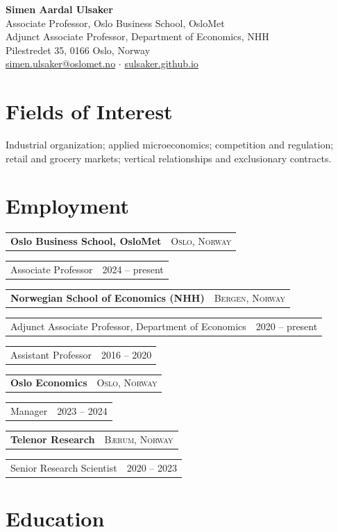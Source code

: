 \documentclass[10pt,a4paper]{article}
\makeatletter
\newcommand{\org}[2]{%
  \vspace{0.42em}%
  \begin{tabularx}{\linewidth}{@{}Xr@{}}
    \textbf{#1} & \textsc{\small #2}
  \end{tabularx}\par\vspace{0.15em}}
\newcommand{\role}[2]{%
  \hspace*{1.1em}%
  \begin{tabularx}{\dimexpr\linewidth-1.1em}{@{}Xr@{}}
    #1 & {\small #2}
  \end{tabularx}\par\vspace{0.1em}}
\makeatother
\begin{document}
\begin{center}
  {\LARGE\bfseries Simen Aardal Ulsaker}\\[0.55em]
  {\small
   Associate Professor, Oslo Business School, OsloMet\\
   Adjunct Associate Professor, Department of Economics, NHH\\[0.35em]
   Pilestredet 35, 0166 Oslo, Norway\\[0.2em]
   \href{mailto:simen.ulsaker@oslomet.no}{simen.ulsaker@oslomet.no} \;$\cdot$\;
   \href{https://sulsaker.github.io}{sulsaker.github.io}}
\end{center}

\vspace{0.6em}

\section{Fields of Interest}

Industrial organization; applied microeconomics; competition and regulation;
retail and grocery markets; vertical relationships and exclusionary contracts.

\section{Employment}

\org{Oslo Business School, OsloMet}{Oslo, Norway}
\role{Associate Professor}{2024 -- present}

\org{Norwegian School of Economics (NHH)}{Bergen, Norway}
\role{Adjunct Associate Professor, Department of Economics}{2020 -- present}
\role{Assistant Professor}{2016 -- 2020}

\org{Oslo Economics}{Oslo, Norway}
\role{Manager}{2023 -- 2024}

\org{Telenor Research}{Bærum, Norway}
\role{Senior Research Scientist}{2020 -- 2023}

\section{Education}
\end{document}

